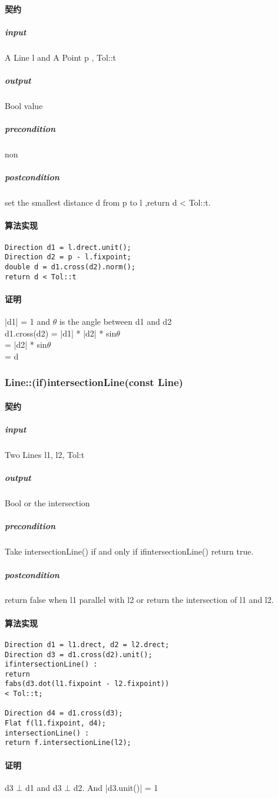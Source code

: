 \documentclass[a4paper]{book}
\numberwithin{equation}{chapter}
\theoremstyle{definition}
\begin{document}
\begin{multicols}{2}
\paragraph{契约}
\subparagraph{input}
A Line l and A Point p , Tol::t
\subparagraph{output}
Bool value
\subparagraph{precondition}
non
\subparagraph{postcondition}
set the smallest distance d from p to l ,return d < Tol::t.
\paragraph{算法实现}
\begin{lstlisting}
Direction d1 = l.drect.unit();
Direction d2 = p - l.fixpoint;
double d = d1.cross(d2).norm();
return d < Tol::t
\end{lstlisting}
\paragraph{证明}
|d1| = 1 and $ \theta $ is the angle between d1 and d2\\
d1.cross(d2) = |d1| * |d2| * sin$ \theta $ \\
= |d2| * sin$ \theta $ \\
= d
\subsubsection{Line::(if)intersectionLine(const Line)}
\paragraph{契约}
\subparagraph{input}
Two Lines l1, l2, Tol:t
\subparagraph{output}
Bool or the intersection
\subparagraph{precondition}
Take intersectionLine() if and only if ifintersectionLine() return true.
\subparagraph{postcondition}
return false when l1 parallel with l2 or return the intersection of l1 and l2.
\paragraph{算法实现}
\begin{lstlisting}
Direction d1 = l1.drect, d2 = l2.drect;
Direction d3 = d1.cross(d2).unit();
ifintersectionLine() : 
return 
fabs(d3.dot(l1.fixpoint - l2.fixpoint)) 
< Tol::t;

Direction d4 = d1.cross(d3);
Flat f(l1.fixpoint, d4);
intersectionLine() : 
return f.intersectionLine(l2);

\end{lstlisting}
\paragraph{证明}
d3 $ \bot $ d1 and d3 $ \bot $ d2. And |d3.unit()| = 1\\


\end{multicols}
\end{document}
